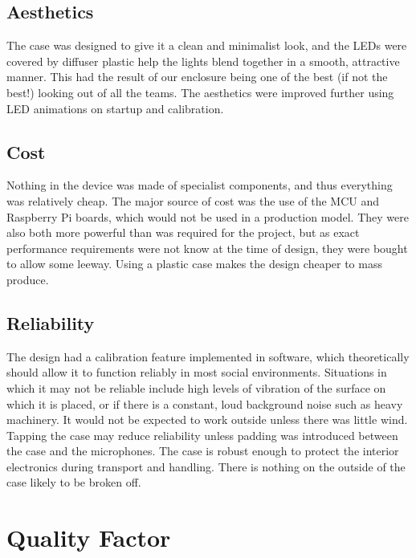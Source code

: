 \documentclass[a4paper]{article}
\begin{document}
\subsection{Aesthetics}
The case was designed to give it a clean and minimalist look, and
the LEDs were covered by diffuser plastic help the lights blend together in a
smooth, attractive manner. This had the result of our enclosure being one of the
best (if not the best!) looking out of all the teams. The aesthetics were
improved further using LED animations on startup and calibration.

\subsection{Cost}
Nothing in the device was made of specialist components, and thus
everything was relatively cheap. The major source of cost was the use of the MCU
and Raspberry Pi boards, which would not be used in a production model. They
were also both more powerful than was required for the project, but as exact
performance requirements were not know at the time of design, they were bought
to allow some leeway. Using a plastic case makes the design cheaper to mass
produce.

\subsection{Reliability}
The design had a calibration feature implemented in software,
which theoretically should allow it to function reliably in most social
environments. Situations in which it may not be reliable include high levels of
vibration of the surface on which it is placed, or if there is a constant, loud
background noise such as heavy machinery. It would not be expected to work
outside unless there was little wind. Tapping the case may reduce reliability
unless padding was introduced between the case and the microphones.  The case is
robust enough to protect the interior electronics during transport and handling.
There is nothing on the outside of the case likely to be broken off.


\section{Quality Factor}
\end{document}
